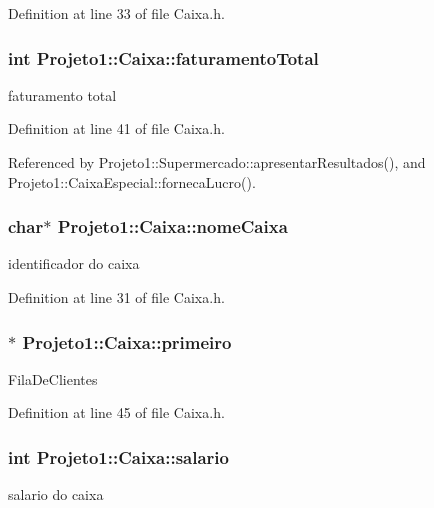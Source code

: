 Definition at line 33 of file Caixa.h.

\hypertarget{classProjeto1_1_1Caixa_aab5d05e900f913ed7d705bcb2c4e899d}{
\subsubsection[{faturamentoTotal}]{\setlength{\rightskip}{0pt plus 5cm}int {\bf Projeto1::Caixa::faturamentoTotal}}}
\label{classProjeto1_1_1Caixa_aab5d05e900f913ed7d705bcb2c4e899d}
faturamento total 

Definition at line 41 of file Caixa.h.



Referenced by Projeto1::Supermercado::apresentarResultados(), and Projeto1::CaixaEspecial::fornecaLucro().

\hypertarget{classProjeto1_1_1Caixa_a3396ba1f8fd63194ff225ffaf0d5268c}{
\subsubsection[{nomeCaixa}]{\setlength{\rightskip}{0pt plus 5cm}char$\ast$ {\bf Projeto1::Caixa::nomeCaixa}}}
\label{classProjeto1_1_1Caixa_a3396ba1f8fd63194ff225ffaf0d5268c}
identificador do caixa 

Definition at line 31 of file Caixa.h.

\hypertarget{classProjeto1_1_1Caixa_a81f31c6847218308e3285c385675c3d9}{
\subsubsection[{primeiro}]{$\ast$ {\bf Projeto1::Caixa::primeiro}}}
\label{classProjeto1_1_1Caixa_a81f31c6847218308e3285c385675c3d9}
FilaDeClientes 

Definition at line 45 of file Caixa.h.

\hypertarget{classProjeto1_1_1Caixa_ad9f8c9b65400bd1db9004dbb3c9f18ea}{
\subsubsection[{salario}]{\setlength{\rightskip}{0pt plus 5cm}int {\bf Projeto1::Caixa::salario}}}
\label{classProjeto1_1_1Caixa_ad9f8c9b65400bd1db9004dbb3c9f18ea}
salario do caixa 

